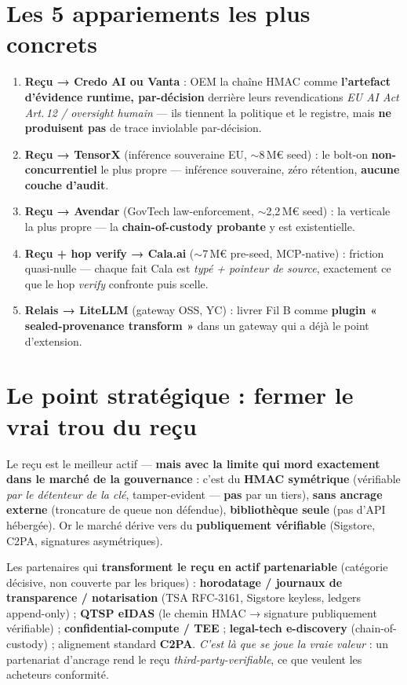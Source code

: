 \documentclass[11pt]{article}
\begin{document}
\section{Les 5 appariements les plus concrets}
\begin{enumerate}[leftmargin=1.5em,itemsep=2pt,topsep=2pt]
\item \textbf{Reçu → Credo AI ou Vanta} : OEM la chaîne HMAC comme \textbf{l'artefact d'évidence
runtime, par-décision} derrière leurs revendications \emph{EU AI Act Art.\,12 / oversight humain} —
ils tiennent la politique et le registre, mais \textbf{ne produisent pas} de trace inviolable
par-décision.
\item \textbf{Reçu → TensorX} (inférence souveraine EU, $\sim$8\,M€ seed) : le bolt-on
\textbf{non-concurrentiel} le plus propre — inférence souveraine, zéro rétention, \textbf{aucune
couche d'audit}.
\item \textbf{Reçu → Avendar} (GovTech law-enforcement, $\sim$2,2\,M€ seed) : la verticale la plus
propre — la \textbf{chain-of-custody probante} y est existentielle.
\item \textbf{Reçu + hop verify → Cala.ai} ($\sim$7\,M€ pre-seed, MCP-native) : friction quasi-nulle —
chaque fait Cala est \emph{typé + pointeur de source}, exactement ce que le hop \emph{verify}
confronte puis scelle.
\item \textbf{Relais → LiteLLM} (gateway OSS, YC) : livrer Fil B comme \textbf{plugin
« sealed-provenance transform »} dans un gateway qui a déjà le point d'extension.
\end{enumerate}

\section{Le point stratégique : fermer le vrai trou du reçu}
Le reçu est le meilleur actif — \textbf{mais avec la limite qui mord exactement dans le marché de la
gouvernance} : c'est du \textbf{HMAC symétrique} (vérifiable \emph{par le détenteur de la clé},
tamper-evident — \textbf{pas} par un tiers), \textbf{sans ancrage externe} (troncature de queue non
défendue), \textbf{bibliothèque seule} (pas d'API hébergée). Or le marché dérive vers du
\textbf{publiquement vérifiable} (Sigstore, C2PA, signatures asymétriques).

Les partenaires qui \textbf{transforment le reçu en actif partenariable} (catégorie décisive, non
couverte par les briques) : \textbf{horodatage / journaux de transparence / notarisation} (TSA
RFC-3161, Sigstore keyless, ledgers append-only) ; \textbf{QTSP eIDAS} (le chemin HMAC → signature
publiquement vérifiable) ; \textbf{confidential-compute / TEE} ; \textbf{legal-tech e-discovery}
(chain-of-custody) ; alignement standard \textbf{C2PA}. \emph{C'est là que se joue la vraie valeur} :
un partenariat d'ancrage rend le reçu \emph{third-party-verifiable}, ce que veulent les acheteurs
conformité.
\end{document}
